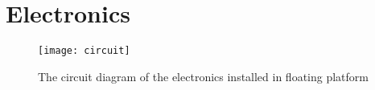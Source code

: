 \section{Electronics}

\begin{figure}[h]
   \centering
   \texttt{[image: circuit]}
   \caption{The circuit diagram of the electronics installed in floating platform}
   \label{fig:circuit}
\end{figure}
